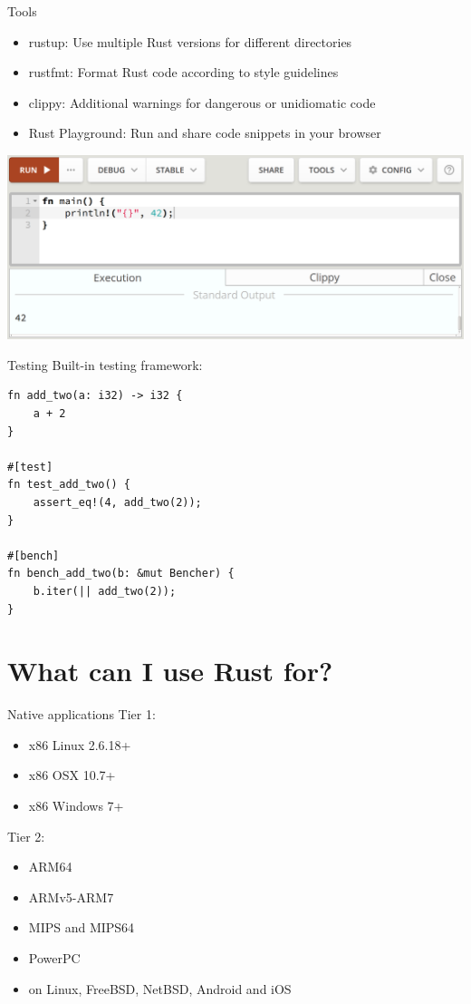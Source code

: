 \documentclass{beamer}
\begin{document}
    \begin{frame}{Tools}
        \begin{itemize}
            \item rustup: Use multiple Rust versions for different directories
            \item rustfmt: Format Rust code according to style guidelines
            \item clippy: Additional warnings for dangerous or unidiomatic code
            \item Rust Playground: Run and share code snippets in your browser
        \end{itemize}
		\includegraphics[width=\textwidth]{playground}
    \end{frame}

    \begin{frame}[fragile]{Testing}
		Built-in testing framework:
        \large\begin{verbatim}
fn add_two(a: i32) -> i32 {
	a + 2
}

#[test]
fn test_add_two() {
	assert_eq!(4, add_two(2));
}

#[bench]
fn bench_add_two(b: &mut Bencher) {
	b.iter(|| add_two(2));
}
        \end{verbatim}
    \end{frame}

\section{What can I use Rust for?}
    \begin{frame}{Native applications}
		Tier 1:
		\begin{itemize}
			\item x86 Linux 2.6.18+
			\item x86 OSX 10.7+
			\item x86 Windows 7+
		\end{itemize}

		Tier 2:
		\begin{itemize}
			\item ARM64
			\item ARMv5-ARM7
			\item MIPS and MIPS64
			\item PowerPC
			\item on Linux, FreeBSD, NetBSD, Android and iOS
		\end{itemize}
    \end{frame}
\end{document}
